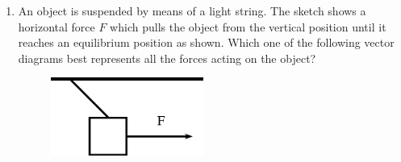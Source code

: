        
        \label{m38819*id197042}\begin{enumerate}[noitemsep, label=\textbf{\arabic*}. ] 
            \label{m38819*uid85}\item An object is suspended by means of a light string. The sketch shows a horizontal force \begin{math}F\end{math} which pulls the object from the vertical position until it reaches an equilibrium position as shown. Which one of the following vector diagrams best represents all the forces acting on the object?

    \setcounter{subfigure}{0}


	\begin{figure}[H] %
    \begin{center}
    \label{m38819*id197072!!!underscore!!!media}\label{m38819*id197072!!!underscore!!!printimage}\includegraphics[width=5cm]{col11305.imgs/m38819_PG11C1_072.png} %
        
      \vspace{2pt}
    \vspace{.1in}
    
    \end{center}

 \end{figure}   

    \addtocounter{footnote}{-0}
    
    
      

\end{enumerate}
